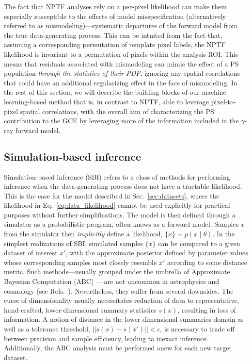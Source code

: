\documentclass[prd,aps,10pt,nofootinbib,twocolumn,superscriptaddress,preprintnumbers,balancelastpage,longbibliography]{revtex4-1}
\begin{document}
The fact that NPTF analyses rely on a per-pixel likelihood can make them especially susceptible to the effects of model misspecification (alternatively referred to as mismodeling)---systematic departures of the forward model from the true data-generating process. This can be intuited from the fact that, assuming a corresponding permutation of template pixel labels, the NPTF likelihood is invariant to a permutation of pixels within the analysis ROI. This means that residuals associated with mismodeling can mimic the effect of a PS population \emph{through the statistics of their PDF}, ignoring any spatial correlations that could have an additional regularizing effect in the face of mismodeling. In the rest of this section, we will describe the building blocks of our machine learning-based method that is, in contrast to NPTF, able to leverage pixel-to-pixel spatial correlations, with the overall aim of characterizing the PS contribution to the GCE by leveraging more of the information included in the $\gamma$-ray forward model.  %


\subsection{Simulation-based inference}


Simulation-based inference (SBI) refers to a class of methods for performing inference when the data-generating process does not have a tractable likelihood. This is the case for the model described in Sec.~\ref{sec:datasets}, where the likelihood in Eq.~\eqref{eq:data_likelihood} cannot be used explicitly for practical purposes without further simplifications. The model is then defined through a simulator as a probabilistic program, often knows as a forward model. Samples ${x}$ from the simulator then \emph{implicitly} define a likelihood, $\{x\}\sim p(x\mid\theta)$. In the simplest realizations of SBI, simulated samples $\{x\}$ can be compared to a given dataset of interest $x'$, with the approximate posterior defined by parameter values whose corresponding samples most closely resemble $x'$ according to some distance metric. Such methods---usually grouped under the umbrella of Approximate Bayesian Computation (ABC)~\cite{10.1214/aos/1176346785}---are not uncommon in astrophysics and cosmology (see Refs.~). Nevertheless, they suffer from several downsides. The curse of dimensionality usually necessitates reduction of data to representative, hand-crafted, lower-dimensional summary statistics $s(x)$, resulting in loss of information. A notion of distance in the lower-dimensional summaries domain as well as a tolerance threshold, $||s(x) - s(x')|| < \epsilon$, is necessary to trade off between precision and sample efficiency, leading to inexact inference. Additionally, the ABC analysis must be performed anew for each new target dataset.
\end{document}

